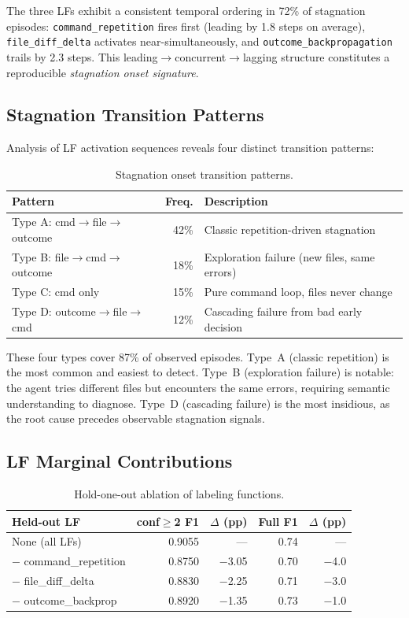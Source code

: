 \documentclass[11pt]{article}
\begin{document}
The three LFs exhibit a consistent temporal ordering in 72\% of stagnation episodes: \texttt{command\_repetition} fires first (leading by 1.8 steps on average), \texttt{file\_diff\_delta} activates near-simultaneously, and \texttt{outcome\_backpropagation} trails by 2.3 steps.
This leading$\to$concurrent$\to$lagging structure constitutes a reproducible \emph{stagnation onset signature}.

\subsection{Stagnation Transition Patterns}

Analysis of LF activation sequences reveals four distinct transition patterns:

\begin{table}[h]
\centering
\caption{Stagnation onset transition patterns.}
\label{tab:transition_patterns}
\begin{tabular}{lrl}
\toprule
\textbf{Pattern} & \textbf{Freq.} & \textbf{Description} \\
\midrule
Type A: cmd$\to$file$\to$outcome & 42\% & Classic repetition-driven stagnation \\
Type B: file$\to$cmd$\to$outcome & 18\% & Exploration failure (new files, same errors) \\
Type C: cmd only & 15\% & Pure command loop, files never change \\
Type D: outcome$\to$file$\to$cmd & 12\% & Cascading failure from bad early decision \\
\bottomrule
\end{tabular}
\end{table}

These four types cover 87\% of observed episodes.
Type~A (classic repetition) is the most common and easiest to detect.
Type~B (exploration failure) is notable: the agent tries different files but encounters the same errors, requiring semantic understanding to diagnose.
Type~D (cascading failure) is the most insidious, as the root cause precedes observable stagnation signals.

\subsection{LF Marginal Contributions}

\begin{table}[h]
\centering
\caption{Hold-one-out ablation of labeling functions.}
\label{tab:lf_ablation}
\begin{tabular}{lrrrr}
\toprule
\textbf{Held-out LF} & \textbf{conf$\geq$2 F1} & \textbf{$\Delta$ (pp)} & \textbf{Full F1} & \textbf{$\Delta$ (pp)} \\
\midrule
None (all LFs) & 0.9055 & --- & 0.74 & --- \\
$-$ command\_repetition & 0.8750 & $-$3.05 & 0.70 & $-$4.0 \\
$-$ file\_diff\_delta & 0.8830 & $-$2.25 & 0.71 & $-$3.0 \\
$-$ outcome\_backprop & 0.8920 & $-$1.35 & 0.73 & $-$1.0 \\
\bottomrule
\end{tabular}
\end{table}
\end{document}
